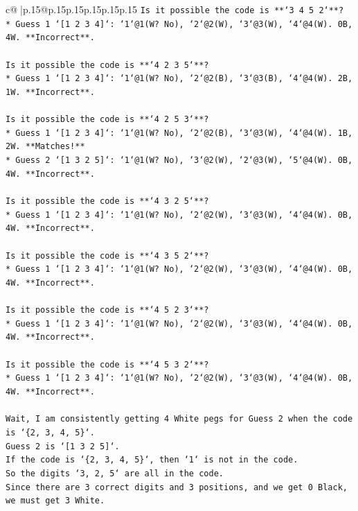 \documentclass{article}
\begin{document}
{\begin{supertabular}{c@{$\;$}|p{.15\linewidth}@{}p{.15\linewidth}p{.15\linewidth}p{.15\linewidth}p{.15\linewidth}p{.15\linewidth}}
{{{\texttt{Is it possible the code is **`3 4 5 2`**?} \\
\texttt{*   Guess 1 `{[}1 2 3 4{]}`: `1`@1(W? No), `2`@2(W), `3`@3(W), `4`@4(W). 0B, 4W. **Incorrect**.} \\
\\ 
\texttt{Is it possible the code is **`4 2 3 5`**?} \\
\texttt{*   Guess 1 `{[}1 2 3 4{]}`: `1`@1(W? No), `2`@2(B), `3`@3(B), `4`@4(W). 2B, 1W. **Incorrect**.} \\
\\ 
\texttt{Is it possible the code is **`4 2 5 3`**?} \\
\texttt{*   Guess 1 `{[}1 2 3 4{]}`: `1`@1(W? No), `2`@2(B), `3`@3(W), `4`@4(W). 1B, 2W. **Matches!**} \\
\texttt{*   Guess 2 `{[}1 3 2 5{]}`: `1`@1(W? No), `3`@2(W), `2`@3(W), `5`@4(W). 0B, 4W. **Incorrect**.} \\
\\ 
\texttt{Is it possible the code is **`4 3 2 5`**?} \\
\texttt{*   Guess 1 `{[}1 2 3 4{]}`: `1`@1(W? No), `2`@2(W), `3`@3(W), `4`@4(W). 0B, 4W. **Incorrect**.} \\
\\ 
\texttt{Is it possible the code is **`4 3 5 2`**?} \\
\texttt{*   Guess 1 `{[}1 2 3 4{]}`: `1`@1(W? No), `2`@2(W), `3`@3(W), `4`@4(W). 0B, 4W. **Incorrect**.} \\
\\ 
\texttt{Is it possible the code is **`4 5 2 3`**?} \\
\texttt{*   Guess 1 `{[}1 2 3 4{]}`: `1`@1(W? No), `2`@2(W), `3`@3(W), `4`@4(W). 0B, 4W. **Incorrect**.} \\
\\ 
\texttt{Is it possible the code is **`4 5 3 2`**?} \\
\texttt{*   Guess 1 `{[}1 2 3 4{]}`: `1`@1(W? No), `2`@2(W), `3`@3(W), `4`@4(W). 0B, 4W. **Incorrect**.} \\
\\ 
\texttt{Wait, I am consistently getting 4 White pegs for Guess 2 when the code is `\{2, 3, 4, 5\}`.} \\
\texttt{Guess 2 is `{[}1 3 2 5{]}`.} \\
\texttt{If the code is `\{2, 3, 4, 5\}`, then `1` is not in the code.} \\
\texttt{So the digits `3, 2, 5` are all in the code.} \\
\texttt{Since there are 3 correct digits and 3 positions, and we get 0 Black, we must get 3 White.} \\
}}}
\end{supertabular}}
\end{document}
